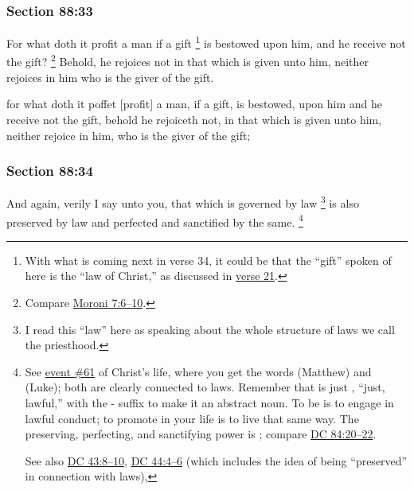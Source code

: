 	\subsubsection{Section 88:33} %
		\label{DC88-33}

		For what doth it profit a man if a gift%
			\footnote{%
				With what is coming next in verse 34, it could be that the ``gift'' spoken of here is the ``law of Christ,'' as discussed in \hyperref[DC88-21]{verse 21}.
				}
		is bestowed upon him, and he receive not the gift?%
			\footnote{%
				Compare \hyperref[MORONI-7-6]{Moroni 7:6--10}.
				}
		Behold, he rejoices not in that which is given unto him, neither rejoices in him who is the giver of the gift.

		\begin{framed}
		\scriptsize
			\begin{compactdesc}
				\item[JSP] for what doth it poffet [profit] a man, if a gift, is bestowed, upon him and he receive not the gift, behold he rejoiceth not, in that which is given unto him, neither rejoice in him, who is the giver of the gift;
			\end{compactdesc}
		\end{framed}

	\subsubsection{Section 88:34} %
		\label{DC88-34}

		And again, verily I say unto you, that which is governed by law%
			\footnote{%
				I read this ``law'' here as speaking about the whole structure of laws we call the priesthood.
				}
		is also preserved by law and perfected and sanctified by the same.%
			\footnote{%
				\label{DC88-34-law}%
				See \hyperref[LCHRIST-061]{event \#61} of Christ's life, where you get the words  (Matthew) and  (Luke); both are clearly connected to laws. Remember that  is just , ``just, lawful,'' with the - suffix to make it an abstract noun. To be  is to engage in lawful conduct; to promote  in your life is to live that same way. The preserving, perfecting, and sanctifying power is \hyperref[DUNAMIS]{}; compare \hyperref[DC84-20]{DC 84:20--22}.
				
				See also \hyperref[DC43-8]{DC 43:8--10}, \hyperref[DC44-4]{DC 44:4--6} (which includes the idea of being ``preserved'' in connection with laws), 
				}

